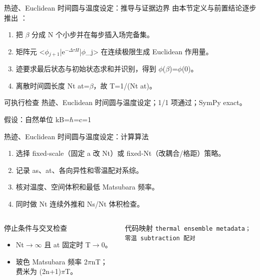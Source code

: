 \begin{frame}[t]{热迹、Euclidean 时间圆与温度设定：推导与证据边界}
\footnotesize
{}\quad 由本节定义与前置结论逐步推出 ：
\begin{enumerate}
\item 把 \ensuremath{\beta} 分成 N 个小步并在每步插入场完备集。
\item 矩阵元 <\ensuremath{\phi}\ensuremath{_{j+1}}|e\ensuremath{^{-\Delta\tau{}H}}|\ensuremath{\phi}\_j> 在连续极限生成 Euclidean 作用量。
\item 迹要求最后状态与初始状态求和并识别，得到 \ensuremath{\phi}(\ensuremath{\beta})=\ensuremath{\phi}(0)。
\item 离散时间圆长度 Nt at=\ensuremath{\beta}，故 T=1/\allowbreak{}(Nt at)。
\end{enumerate}\begin{block}{可执行检查}
\quad 热迹、Euclidean 时间圆与温度设定；1/1 项通过；SymPy exact。
\par\scriptsize 假设：自然单位 kB=\ensuremath{\hbar}=c=1
\end{block}
\end{frame}

\begin{frame}[t]{热迹、Euclidean 时间圆与温度设定：计算算法}
\footnotesize
{}\begin{enumerate}
\item 选择 fixed-scale（固定 a 改 Nt）或 fixed-Nt（改耦合/\allowbreak{}格距）策略。
\item 记录 as、at、各向异性和零温配对系综。
\item 核对温度、空间体积和最低 Matsubara 频率。
\item 同时做 Nt 连续外推和 Ns/\allowbreak{}Nt 体积检查。
\end{enumerate}\begin{columns}[T,onlytextwidth]
\begin{block}{停止条件与交叉检查}\scriptsize\begin{itemize}
\item[\CheckMark] Nt\ensuremath{\rightarrow}\ensuremath{\infty} 且 at 固定时 T\ensuremath{\rightarrow}0。
\item[\CheckMark] 玻色 Matsubara 频率 2\ensuremath{\pi}nT；费米为 (2n+1)\ensuremath{\pi}T。
\end{itemize}\end{block}
\begin{block}{代码映射}
\scriptsize \texttt{thermal ensemble metadata；零温 subtraction 配对}
\end{block}\end{columns}\end{frame}

